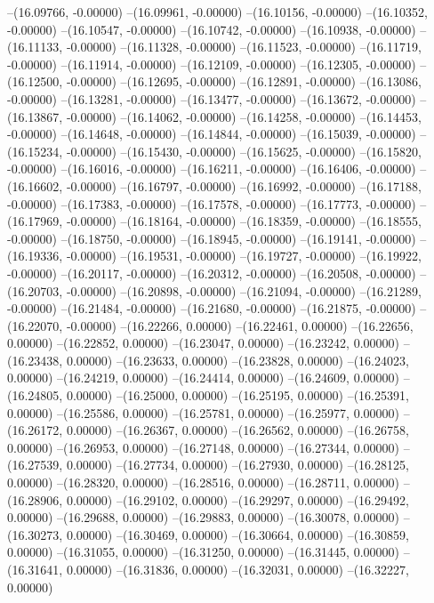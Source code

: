 --(16.09766, -0.00000)
--(16.09961, -0.00000)
--(16.10156, -0.00000)
--(16.10352, -0.00000)
--(16.10547, -0.00000)
--(16.10742, -0.00000)
--(16.10938, -0.00000)
--(16.11133, -0.00000)
--(16.11328, -0.00000)
--(16.11523, -0.00000)
--(16.11719, -0.00000)
--(16.11914, -0.00000)
--(16.12109, -0.00000)
--(16.12305, -0.00000)
--(16.12500, -0.00000)
--(16.12695, -0.00000)
--(16.12891, -0.00000)
--(16.13086, -0.00000)
--(16.13281, -0.00000)
--(16.13477, -0.00000)
--(16.13672, -0.00000)
--(16.13867, -0.00000)
--(16.14062, -0.00000)
--(16.14258, -0.00000)
--(16.14453, -0.00000)
--(16.14648, -0.00000)
--(16.14844, -0.00000)
--(16.15039, -0.00000)
--(16.15234, -0.00000)
--(16.15430, -0.00000)
--(16.15625, -0.00000)
--(16.15820, -0.00000)
--(16.16016, -0.00000)
--(16.16211, -0.00000)
--(16.16406, -0.00000)
--(16.16602, -0.00000)
--(16.16797, -0.00000)
--(16.16992, -0.00000)
--(16.17188, -0.00000)
--(16.17383, -0.00000)
--(16.17578, -0.00000)
--(16.17773, -0.00000)
--(16.17969, -0.00000)
--(16.18164, -0.00000)
--(16.18359, -0.00000)
--(16.18555, -0.00000)
--(16.18750, -0.00000)
--(16.18945, -0.00000)
--(16.19141, -0.00000)
--(16.19336, -0.00000)
--(16.19531, -0.00000)
--(16.19727, -0.00000)
--(16.19922, -0.00000)
--(16.20117, -0.00000)
--(16.20312, -0.00000)
--(16.20508, -0.00000)
--(16.20703, -0.00000)
--(16.20898, -0.00000)
--(16.21094, -0.00000)
--(16.21289, -0.00000)
--(16.21484, -0.00000)
--(16.21680, -0.00000)
--(16.21875, -0.00000)
--(16.22070, -0.00000)
--(16.22266, 0.00000)
--(16.22461, 0.00000)
--(16.22656, 0.00000)
--(16.22852, 0.00000)
--(16.23047, 0.00000)
--(16.23242, 0.00000)
--(16.23438, 0.00000)
--(16.23633, 0.00000)
--(16.23828, 0.00000)
--(16.24023, 0.00000)
--(16.24219, 0.00000)
--(16.24414, 0.00000)
--(16.24609, 0.00000)
--(16.24805, 0.00000)
--(16.25000, 0.00000)
--(16.25195, 0.00000)
--(16.25391, 0.00000)
--(16.25586, 0.00000)
--(16.25781, 0.00000)
--(16.25977, 0.00000)
--(16.26172, 0.00000)
--(16.26367, 0.00000)
--(16.26562, 0.00000)
--(16.26758, 0.00000)
--(16.26953, 0.00000)
--(16.27148, 0.00000)
--(16.27344, 0.00000)
--(16.27539, 0.00000)
--(16.27734, 0.00000)
--(16.27930, 0.00000)
--(16.28125, 0.00000)
--(16.28320, 0.00000)
--(16.28516, 0.00000)
--(16.28711, 0.00000)
--(16.28906, 0.00000)
--(16.29102, 0.00000)
--(16.29297, 0.00000)
--(16.29492, 0.00000)
--(16.29688, 0.00000)
--(16.29883, 0.00000)
--(16.30078, 0.00000)
--(16.30273, 0.00000)
--(16.30469, 0.00000)
--(16.30664, 0.00000)
--(16.30859, 0.00000)
--(16.31055, 0.00000)
--(16.31250, 0.00000)
--(16.31445, 0.00000)
--(16.31641, 0.00000)
--(16.31836, 0.00000)
--(16.32031, 0.00000)
--(16.32227, 0.00000)
